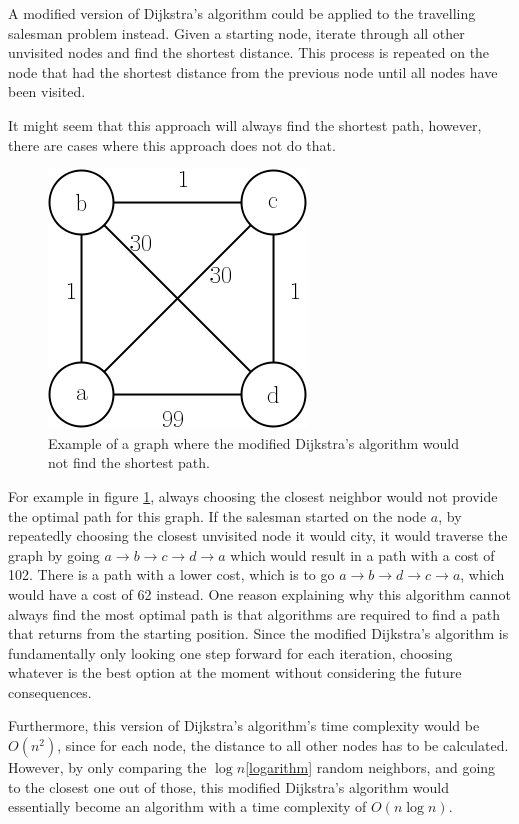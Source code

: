 \documentclass{article}
\begin{document}
\noindent
A modified version of Dijkstra's algorithm could be applied to the travelling salesman problem instead. Given a starting node, iterate through all other unvisited nodes and find the shortest distance. This process is repeated on the node that had the shortest distance from the previous node until all nodes have been visited. 

\noindent
It might seem that this approach will always find the shortest path, however, there are cases where this approach does not do that. 

\begin{figure}[ht]
     \centering
     \includegraphics[scale=0.5]{docs/pictures/dijkstras.png}
     \caption{Example of a graph where the modified Dijkstra's algorithm would not find the shortest path.}
     \label{Figure:CounterExampleDijkstras}
\end{figure}
\noindent
For example in figure \ref{Figure:CounterExampleDijkstras}, always choosing the closest neighbor would not provide the optimal path for this graph. If the salesman started on the node $a$, by repeatedly choosing the closest unvisited node it would city, it would traverse the graph by going $a \rightarrow b \rightarrow c \rightarrow d \rightarrow a$ which would result in a path with a cost of 102. There is a path with a lower cost, which is to go $a \rightarrow b \rightarrow d \rightarrow c \rightarrow a$, which would have a cost of 62 instead. One reason explaining why this algorithm cannot always find the most optimal path is that algorithms are required to find a path that returns from the starting position. Since the modified Dijkstra's algorithm is fundamentally only looking one step forward for each iteration, choosing whatever is the best option at the moment without considering the future consequences.

\noindent
Furthermore, this version of Dijkstra's algorithm's time complexity would be $O(n^2)$, since for each node, the distance to all other nodes has to be calculated. However, by only comparing the $\log{n}$\ref{logarithm} random neighbors, and going to the closest one out of those, this modified Dijkstra's algorithm would essentially become an algorithm with a time complexity of $O(n \log{n})$. 
\end{document}
